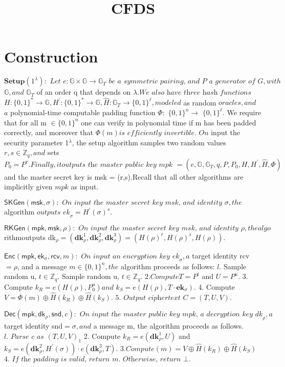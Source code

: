 \documentclass[runningheads]{llncs}
\begin{document}
\title{CFDS}

\section{Construction}
$\mathbf{Setup}( 1^\lambda ) {: }\textit{ Let e}: \mathbb{G} \times \mathbb{G} \to \mathbb{G} _T\textit{ be a symmetric pairing, and P a generator of G}, with$
$\mathbb{G} , and$ $\mathbb{G} _T$ of an order q that depends on $\lambda . \textit{We also have three hash functions}$ $H:\{0,1\}^*\to\mathbb{G},H^{\prime}:\{0,1\}^*\to\mathbb{G},\hat{H}:\mathbb{G}_T\to\{0,1\}^\ell,modeled$ as random $oracles,and$ $a$ polynomial-time computable padding function $\Phi :$ $\{ 0, 1\} ^n\to$ $\{0,1\}^\ell.$ We require that for all m $\in\{0,1\}^n$ one can verify in polynomial time if m has been padded correctly, and moreover that $\Phi ( m) is\textit{ efficiently invertible. On}$ input the security parameter 1$^\lambda$, the setup algorithm samples two random values $r,s\in\mathbb{Z}_q,and$ sets $P_0= P^r. Finally, it\textit{outputs the master public key mpk }=(e,\mathbb{G},\mathbb{G}_T,q,P,P_0,H,H^{\prime},\hat{H},\Phi)$ and the master secret key is msk = (r,s).Recall that all other algorithms are implicitly given $mpk$ as input.

$\mathsf{SKGen}( \mathsf{msk}, \sigma ) {: }\textit{ On input the master secret key msk,  and identity }\sigma , the$ algorithm
$o\textit{utputs ek}_\sigma=H^{\prime}(\sigma)^s.$

$\mathsf{RKGen}( \mathsf{mpk}, \mathsf{msk}, \rho ) {: }\textit{ On input the master secret key msk,  and identity }\rho , the algo$
rithmoutputs dk$_\rho=(\mathbf{d}\mathbf{k}_\rho^1,\mathbf{d}\mathbf{k}_\rho^2,\mathbf{d}\mathbf{k}_\rho^3)=(H(\rho)^r,H(\rho)^s,H(\rho)).$

$\mathsf{Enc}( \mathsf{mpk}, \mathsf{ek}_\sigma , \mathsf{rcv}, m) {: }\textit{ On input an encryption key ek}_\sigma , a$ target identity rcv $=\rho$,
and a message $m\in\{0,1\}^n,the$ algorithm proceeds as follows:
$l.$ Sample random u,  $t\in \mathbb{Z} _q.$ Sample random u,  $t\in \mathbb{Z} _q.$
$2. \textit{Compute}T= P^t$ and $U=P^u.$
3. Compute $k_R= e( H( \rho ) , P_0^u) \textit{and }k_S= e( H( \rho ) , T\cdot \mathbf{ek}_\sigma ) .$
4. Compute $V=\Phi(m)\oplus\hat{H}(k_R)\oplus\hat{H}(k_S).$
$5. \textit{ Output ciphertext C}= ( T, U, V) .$

$\mathsf{Dec}( \mathsf{mpk}, \mathsf{dk}_\rho , \mathsf{snd}, c) {: }\textit{ On input the master public key mpk,  }a\textit{ decryption key dk}_\rho , a$
target identity snd$=\sigma,and$ a message m, the algorithm proceeds as follows.
$l. \textit{ Parse c as }( T, U, V) _1$
2. Compute $k_R=e(\mathbf{d}\mathbf{k}_\rho^1,U)$ and $k_S=e(\mathbf{d}\mathbf{k}_\rho^2,H^{\prime}(\sigma))\cdot e(\mathbf{d}\mathbf{k}_\rho^3,T).$
$3. \textit{Compute}( m) = V\oplus \hat{H} ( k_R) \oplus \hat{H} ( k_S)$
$4. \textit{ If the padding is valid,  return m.  Otherwise,  return }\bot .$
\end{document}
